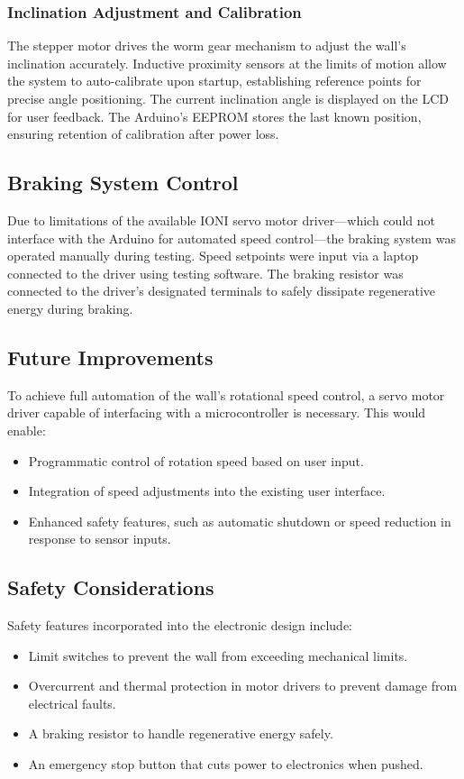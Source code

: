 \subsubsection{Inclination Adjustment and Calibration}

The stepper motor drives the worm gear mechanism to adjust the wall's inclination accurately. Inductive proximity sensors at the limits of motion allow the system to auto-calibrate upon startup, establishing reference points for precise angle positioning. The current inclination angle is displayed on the LCD for user feedback. The Arduino's EEPROM stores the last known position, ensuring retention of calibration after power loss.

\subsection{Braking System Control}

Due to limitations of the available IONI servo motor driver—which could not interface with the Arduino for automated speed control—the braking system was operated manually during testing. Speed setpoints were input via a laptop connected to the driver using testing software. The braking resistor was connected to the driver's designated terminals to safely dissipate regenerative energy during braking.

\subsection{Future Improvements}

To achieve full automation of the wall's rotational speed control, a servo motor driver capable of interfacing with a microcontroller is necessary. This would enable:

\begin{itemize}
    \item Programmatic control of rotation speed based on user input.
    \item Integration of speed adjustments into the existing user interface.
    \item Enhanced safety features, such as automatic shutdown or speed reduction in response to sensor inputs.
\end{itemize}

\subsection{Safety Considerations}

Safety features incorporated into the electronic design include:

\begin{itemize}
    \item Limit switches to prevent the wall from exceeding mechanical limits.
    \item Overcurrent and thermal protection in motor drivers to prevent damage from electrical faults.
    \item A braking resistor to handle regenerative energy safely.
    \item An emergency stop button that cuts power to electronics when pushed.
\end{itemize}
